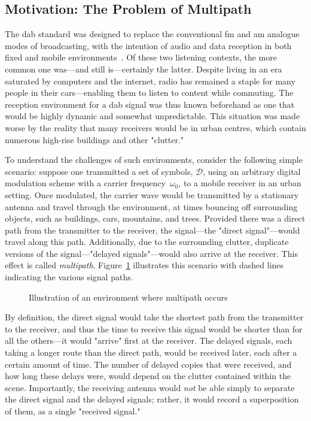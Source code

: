 \documentclass[class=report,11pt,crop=false]{standalone}
\begin{document}
\subsection{Motivation: The Problem of Multipath \label{subsect:multipath}}

The \gls{dab} standard was designed to replace the conventional \gls{fm} and \gls{am} analogue modes of broadcasting, with the intention of audio and data reception in both fixed and mobile environments~\cite{dabstandard}. Of these two listening contexts, the more common one was---and still is---certainly the latter. Despite living in an era saturated by computers and the internet, radio has remained a staple for many people in their cars---enabling them to listen to content while commuting. The reception environment for a \gls{dab} signal was thus known beforehand as one that would be highly dynamic and somewhat unpredictable. This situation was made worse by the reality that many receivers would be in urban centres, which contain numerous high-rise buildings and other "clutter."

To understand the challenges of such environments, consider the following simple scenario: suppose one transmitted a set of symbols, \(\mathcal{D}\), using an arbitrary digital modulation scheme with a carrier frequency~\(\omega_0\), to a mobile receiver in an urban setting. Once modulated, the carrier wave would be transmitted by a stationary antenna and travel through the environment, at times bouncing off surrounding objects, such as buildings, cars, mountains, and trees. Provided there was a direct path from the transmitter to the receiver, the signal---the "direct signal"---would travel along this path. Additionally, due to the surrounding clutter, duplicate versions of the signal---"delayed signals"---would also arrive at the receiver. This effect is called \emph{multipath}. Figure~\ref{fig:multipath-illustration} illustrates this scenario with dashed lines indicating the various signal paths.

\begin{figure}[htbp]
    \centering
    \captionsetup{type=figure}
    \def\svgwidth{0.8\linewidth}
    { %
    \scriptsize
        }
    \caption{Illustration of an environment where multipath occurs}
    \label{fig:multipath-illustration}
\end{figure}

By definition, the direct signal would take the shortest path from the transmitter to the receiver, and thus the time to receive this signal would be shorter than for all the others---it would "arrive" first at the receiver. The delayed signals, each taking a longer route than the direct path, would be received later, each after a certain amount of time. The number of delayed copies that were received, and how long these delays were, would depend on the clutter contained within the scene. Importantly, the receiving antenna would \emph{not} be able simply to separate the direct signal and the delayed signals; rather, it would record a superposition of them, as a single "received signal."
\end{document}
